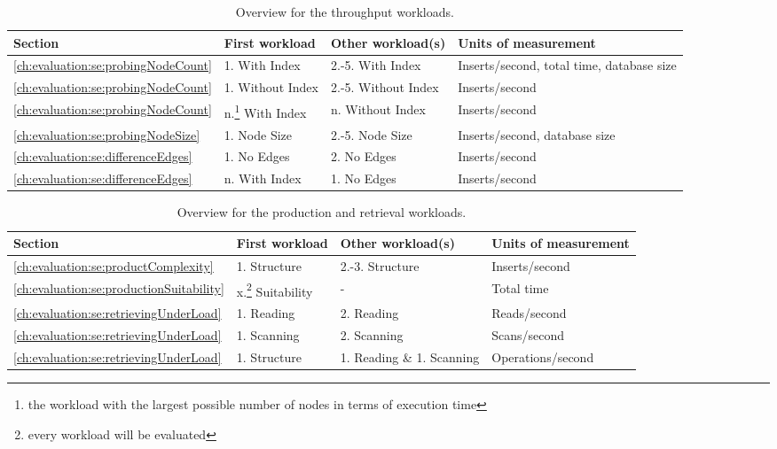 \begin{table}
  \begin{minipage}{\textwidth}
    \centering
    \begin{tabularx}{\textwidth}{ | l | l | l | X | }
      \hline
      Section & First workload & Other workload(s) & Units of measurement \\ \hline
      \ref{ch:evaluation:se:probingNodeCount} & 1. With Index & 2.-5. With Index & Inserts/second, total time, database size \\ \hline
      \ref{ch:evaluation:se:probingNodeCount} & 1. Without Index & 2.-5. Without Index & Inserts/second \\ \hline
      \ref{ch:evaluation:se:probingNodeCount} & n.\footnote{the workload with the largest possible number of nodes in terms of execution time} With Index & n. Without Index & Inserts/second \\ \hline
      \ref{ch:evaluation:se:probingNodeSize} & 1. Node Size & 2.-5. Node Size & Inserts/second, database size \\ \hline
      \ref{ch:evaluation:se:differenceEdges} & 1. No Edges & 2. No Edges & Inserts/second \\ \hline
      \ref{ch:evaluation:se:differenceEdges} & n. With Index & 1. No Edges & Inserts/second \\ \hline
    \end{tabularx}
  \end{minipage}
  \caption{Overview for the throughput workloads. }
  \label{tab:throughputOverview}
\end{table}
\begin{table}
  \begin{minipage}{\textwidth}
    \centering
    \begin{tabularx}{\textwidth}{ | l | l | X | X | }
      \hline
      Section & First workload & Other workload(s) & Units of measurement \\ \hline
      \ref{ch:evaluation:se:productComplexity} & 1. Structure & 2.-3. Structure & Inserts/second \\ \hline
      \ref{ch:evaluation:se:productionSuitability} & x.\footnote{every workload will be evaluated} Suitability & - & Total time \\ \hline
      \ref{ch:evaluation:se:retrievingUnderLoad} & 1. Reading & 2. Reading & Reads/second \\ \hline
      \ref{ch:evaluation:se:retrievingUnderLoad} & 1. Scanning & 2. Scanning & Scans/second \\ \hline
      \ref{ch:evaluation:se:retrievingUnderLoad} & 1. Structure & 1. Reading \& 1. Scanning & Operations/second \\ \hline
    \end{tabularx}
  \end{minipage}
  \caption{Overview for the production and retrieval workloads.}
  \label{tab:productionOverview}
\end{table}

